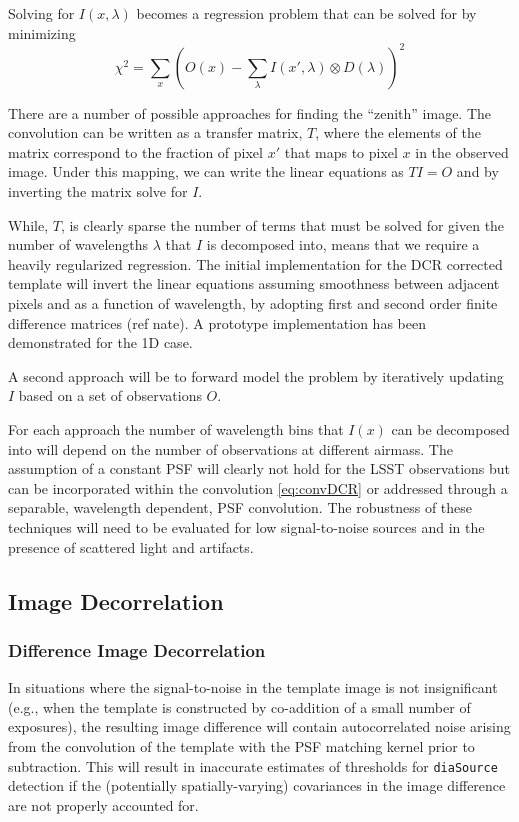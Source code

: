 Solving for $I(x,\lambda)$ becomes a regression problem that can be 
solved for by minimizing
\begin{equation}
\chi^2 = \sum_x (O(x) - \sum_\lambda I(x',\lambda) \otimes D(\lambda))^2 
\end{equation}

There are a number of possible approaches for finding the ``zenith''
image.  The convolution can be written as a transfer matrix, $T$,
where the elements of the matrix correspond to the fraction of pixel $x'$ that maps to pixel $x$ in the observed image. Under this mapping, we can write the linear equations as $TI=O$ and by inverting the matrix solve for $I$. 

While,  $T$, is clearly sparse the number of terms that must be solved for given the number of wavelengths $\lambda$ that $I$ is decomposed into, means that we require a heavily regularized regression. The initial implementation for the DCR corrected template will invert the linear equations assuming smoothness between adjacent pixels and as a function of wavelength, by adopting first and second
order finite difference matrices (ref nate).  A prototype implementation has been demonstrated for the 1D case.  

A second approach will be to forward model the problem by iteratively updating
$I$ based on a set of observations $O$.

For each approach the number of wavelength bins that $I(x)$ can be decomposed into will depend on the number of observations at different airmass. The assumption of a constant PSF will clearly not hold for the LSST observations but can be incorporated within the convolution \autoref{eq:convDCR} or addressed through a separable, wavelength dependent, PSF convolution. The robustness of these techniques will need to be evaluated for low signal-to-noise sources and in the presence of scattered light and artifacts. 

\subsection{Image Decorrelation}
\label{sec:acImageDecorrelation}
\subsubsection{Difference Image Decorrelation}
\label{sec:acDiffImDecorrelation}

In situations where the signal-to-noise in the template image is not insignificant (e.g., when the template is constructed by co-addition of a small number of exposures), the resulting image difference will contain autocorrelated noise arising from the convolution of the template with the PSF matching kernel prior to subtraction. This will result in inaccurate estimates of thresholds for {\tt diaSource} detection if the (potentially spatially-varying) covariances in the image difference are not properly accounted for.

